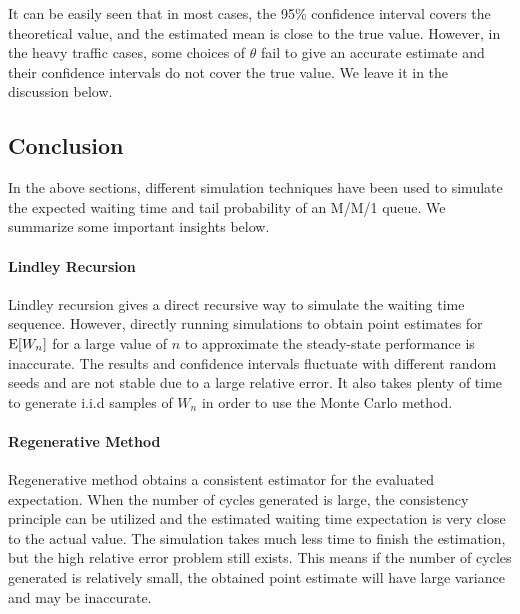 \documentclass{article}
\begin{document}
It can be easily seen that in most cases, the 95\% confidence interval covers the theoretical value, and the estimated mean is close to the true value. However, in the heavy traffic cases, some choices of $\theta$ fail to give an accurate estimate and their confidence intervals do not cover the true value. We leave it in the discussion below.

\subsection{Conclusion}
In the above sections, different simulation techniques have been used to simulate the expected waiting time and tail probability of an M/M/1 queue. We summarize some important insights below.

\paragraph{Lindley Recursion}
Lindley recursion gives a direct recursive way to simulate the waiting time sequence. However, directly running simulations to obtain point estimates for ${\rm E}[W_n]$ for a large value of $n$ to approximate 
the steady-state performance is inaccurate. The results and confidence intervals fluctuate with different random seeds and are not stable due to a large relative error. It also takes plenty of time to generate i.i.d samples of $W_n$ in order to use the Monte Carlo method.

\paragraph{Regenerative Method}
Regenerative method obtains a consistent estimator for the evaluated expectation. When the number of cycles generated is large, the consistency principle can be utilized and the estimated waiting time expectation is very close to the actual value. 
The simulation takes much less time to finish the estimation, but the high relative error problem still exists. This means if the number of cycles generated is relatively small, the obtained point estimate will have large variance and may be inaccurate.
\end{document}
